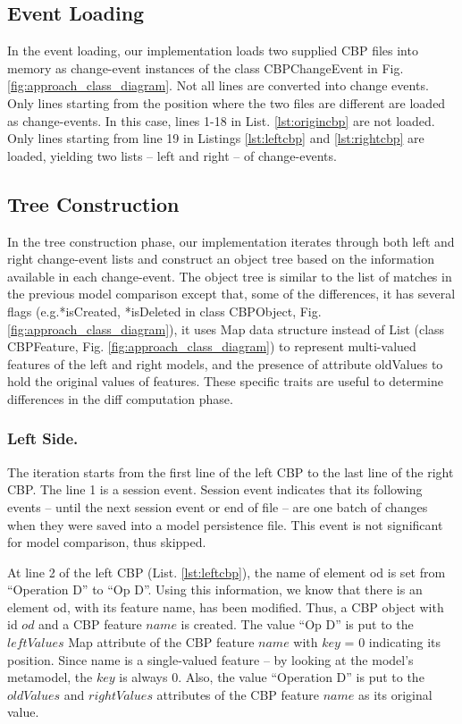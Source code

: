 \documentclass{llncs}
\begin{document}
\subsection{Event Loading}
\label{sec:event_loading}
In the event loading, our implementation loads two supplied CBP files into memory as change-event instances of the class \textsf{CBPChangeEvent} in Fig. \ref{fig:approach_class_diagram}. Not all lines are converted into change events. Only lines starting from the position where the two files are different are loaded as change-events. In this case, lines 1-18 in List. \ref{lst:origincbp} are not loaded. Only lines starting from line 19 in Listings \ref{lst:leftcbp} and \ref{lst:rightcbp} are loaded, yielding two lists -- left and right -- of change-events. 

\subsection{Tree Construction}
\label{sec:tree_construction}
In the tree construction phase, our implementation iterates through both left and right change-event lists and construct an object tree based on the information available in each change-event. The object tree is similar to the list of matches in the previous model comparison except that, some of the differences, it has several flags (e.g.\textsf{*isCreated}, \textsf{*isDeleted} in class \textsf{CBPObject}, Fig. \ref{fig:approach_class_diagram}), it uses Map data structure instead of List (class \textsf{CBPFeature}, Fig. \ref{fig:approach_class_diagram}) to represent multi-valued features of the left and right models, and the presence of attribute \textsf{oldValues} to hold the original values of features. These specific traits are useful to determine differences in the diff computation phase.

\subsubsection{Left Side.}\label{sec:left_side} The iteration starts from the first line of the left CBP to the last line of the right CBP. The line 1 is a session event. Session event indicates that its following events -- until the next session event or end of file -- are one batch of changes when they were saved into a model persistence file. This event is not significant for model comparison, thus skipped.  



At line 2 of the left CBP (List. \ref{lst:leftcbp}), the \textsf{name} of element \textsf{od} is set from ``Operation D'' to ``Op D''. Using this information, we know that there is an element \textsf{od}, with its feature \textsf{name}, has been modified. Thus, a CBP object with id $od$ and a CBP feature $name$ is created. The value ``Op D'' is put to the $leftValues$ Map attribute of the CBP feature $name$ with $key$ = 0 indicating its position. Since \textsf{name} is a single-valued feature -- by looking at the model's metamodel, the $key$ is always 0. Also, the value ``Operation D'' is put to the $oldValues$ and $rightValues$ attributes of the CBP feature $name$ as its original value. 
\end{document}
